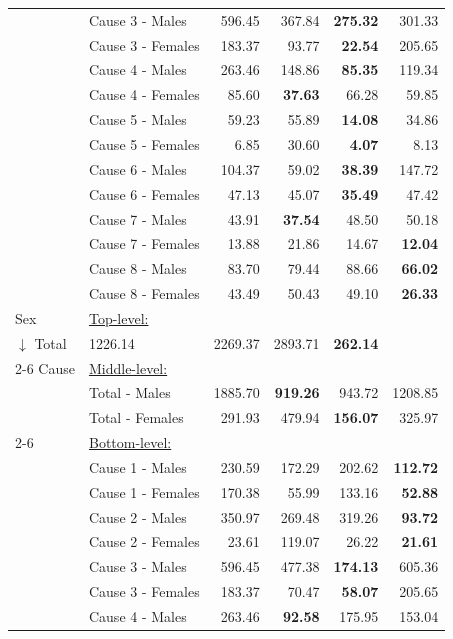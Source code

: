 \begin{center}
\begin{small}
\begin{longtable}{@{}llrrrr@{}}
& Cause 3 - Males & 596.45 & 367.84 & \textbf{275.32} & 301.33 \\
& Cause 3 - Females & 183.37 & 93.77 & \textbf{22.54} & 205.65 \\
& Cause 4 - Males & 263.46 & 148.86 & \textbf{85.35} & 119.34 \\
& Cause 4 - Females & 85.60 & \textbf{37.63} & 66.28 & 59.85 \\
& Cause 5 - Males & 59.23 & 55.89 & \textbf{14.08} & 34.86 \\
& Cause 5 - Females & 6.85 & 30.60 & \textbf{4.07} & 8.13 \\
& Cause 6 - Males & 104.37 & 59.02 & \textbf{38.39} & 147.72 \\
& Cause 6 - Females & 47.13 & 45.07 & \textbf{35.49} & 47.42 \\
& Cause 7 - Males & 43.91 & \textbf{37.54} & 48.50 & 50.18 \\
& Cause 7 - Females & 13.88 & 21.86 & 14.67 & \textbf{12.04} \\
& Cause 8 - Males & 83.70 & 79.44 & 88.66 & \textbf{66.02} \\
& Cause 8 - Females & 43.49 & 50.43 & 49.10 & \textbf{26.33} \\
\midrule
Sex & \multicolumn{5}{l}{\underline{Top-level:}}\\
$\downarrow$  Total & 1226.14 & 2269.37 & 2893.71 & \textbf{262.14} \\
\cmidrule{2-6}
Cause & \multicolumn{5}{l}{\underline{Middle-level:}}\\
& Total - Males & 1885.70 & \textbf{919.26} & 943.72 & 1208.85 \\
& Total - Females & 291.93 & 479.94 & \textbf{156.07} & 325.97 \\
\cmidrule{2-6}
& \multicolumn{5}{l}{\underline{Bottom-level:}}\\
& Cause 1 - Males & 230.59 & 172.29 & 202.62 & \textbf{112.72} \\
& Cause 1 - Females & 170.38 & 55.99 & 133.16 & \textbf{52.88} \\
& Cause 2 - Males & 350.97 & 269.48 & 319.26 & \textbf{93.72} \\
& Cause 2 - Females & 23.61 & 119.07 & 26.22 & \textbf{21.61} \\
& Cause 3 - Males & 596.45 & 477.38 & \textbf{174.13} & 605.36 \\
& Cause 3 - Females & 183.37 & 70.47 & \textbf{58.07} & 205.65 \\
& Cause 4 - Males & 263.46 & \textbf{92.58} & 175.95 & 153.04 \\

\end{longtable}
\end{small}
\end{center}
